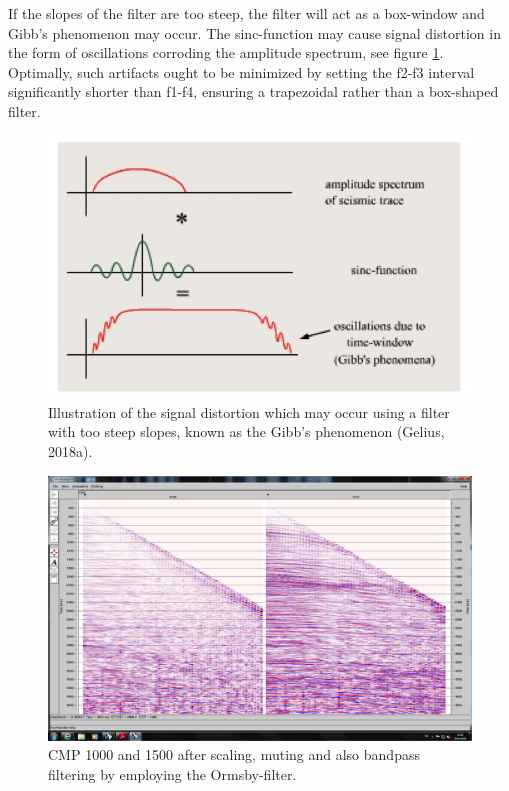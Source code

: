 \documentclass[10pt,a4paper]{article}
\begin{document}
\noindent If the slopes of the filter are too steep, the filter will act as a box-window and Gibb’s phenomenon may occur. The sinc-function may cause signal distortion in the form of oscillations corroding the amplitude spectrum, see figure \ref{fig10}. Optimally, such artifacts ought to be minimized by setting the f2-f3 interval significantly shorter than f1-f4, ensuring a trapezoidal rather than a box-shaped filter.


\begin{figure}[H]
\centering
\includegraphics[scale=0.4]{fig10.jpg}
\caption{Illustration of the signal distortion which may occur using a filter with too steep slopes, known as the Gibb’s phenomenon (Gelius, 2018a).}
\label{fig10}
\end{figure}

\begin{figure}[H]
\includegraphics[width=\textwidth, trim={1.5cm 1.5cm 1cm 1.5cm},clip]{fig11.jpg}
\caption{CMP 1000 and 1500 after scaling, muting and also bandpass filtering by employing the Ormsby-filter.}
\label{fig11}
\end{figure}
\end{document}
